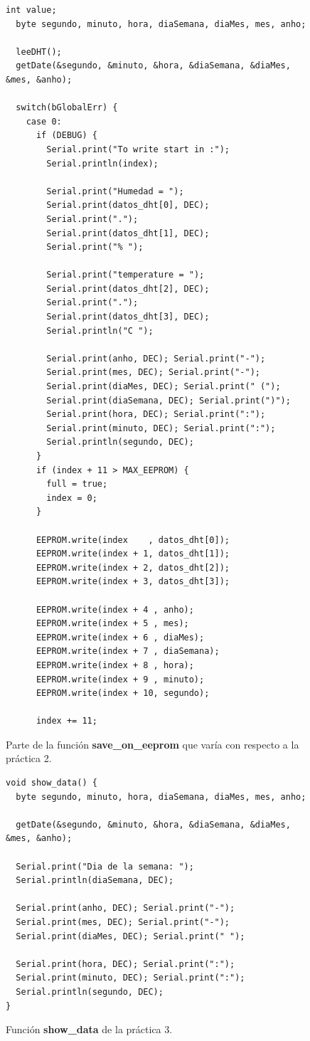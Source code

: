 \documentclass{article}
\begin{document}
\begin{figure}[h]
	\begin{lstlisting}[style=c]
  int value;
  byte segundo, minuto, hora, diaSemana, diaMes, mes, anho;
  
  leeDHT();
  getDate(&segundo, &minuto, &hora, &diaSemana, &diaMes, &mes, &anho);
  
  switch(bGlobalErr) {
    case 0:
      if (DEBUG) {
        Serial.print("To write start in :");
        Serial.println(index);
        
        Serial.print("Humedad = ");
        Serial.print(datos_dht[0], DEC);
        Serial.print(".");
        Serial.print(datos_dht[1], DEC);
        Serial.print("% ");
      
        Serial.print("temperature = ");
        Serial.print(datos_dht[2], DEC);
        Serial.print(".");
        Serial.print(datos_dht[3], DEC);
        Serial.println("C ");
        
        Serial.print(anho, DEC); Serial.print("-");
        Serial.print(mes, DEC); Serial.print("-");
        Serial.print(diaMes, DEC); Serial.print(" (");
        Serial.print(diaSemana, DEC); Serial.print(")");
        Serial.print(hora, DEC); Serial.print(":");
        Serial.print(minuto, DEC); Serial.print(":");
        Serial.println(segundo, DEC);
      }
      if (index + 11 > MAX_EEPROM) {
        full = true;
        index = 0; 
      }
      
      EEPROM.write(index    , datos_dht[0]);
      EEPROM.write(index + 1, datos_dht[1]);
      EEPROM.write(index + 2, datos_dht[2]);
      EEPROM.write(index + 3, datos_dht[3]);
      
      EEPROM.write(index + 4 , anho);
      EEPROM.write(index + 5 , mes);
      EEPROM.write(index + 6 , diaMes);
      EEPROM.write(index + 7 , diaSemana);
      EEPROM.write(index + 8 , hora);
      EEPROM.write(index + 9 , minuto);
      EEPROM.write(index + 10, segundo);
      
      index += 11;
	\end{lstlisting}
	\caption{Parte de la función \textbf{save\_on\_eeprom} que varía con respecto a la práctica 2.}
	\label{cod:p3:save_on_eeprom}
\end{figure}

\begin{figure}[h]
	\begin{lstlisting}[style=c]
void show_data() {
  byte segundo, minuto, hora, diaSemana, diaMes, mes, anho;
  
  getDate(&segundo, &minuto, &hora, &diaSemana, &diaMes, &mes, &anho);
  
  Serial.print("Dia de la semana: ");
  Serial.println(diaSemana, DEC);
  
  Serial.print(anho, DEC); Serial.print("-");
  Serial.print(mes, DEC); Serial.print("-");
  Serial.print(diaMes, DEC); Serial.print(" ");
  
  Serial.print(hora, DEC); Serial.print(":");
  Serial.print(minuto, DEC); Serial.print(":");
  Serial.println(segundo, DEC);
}
	\end{lstlisting}
	\caption{Función \textbf{show\_data} de la práctica 3.}
	\label{cod:p3:show_data}
\end{figure}
\end{document}
